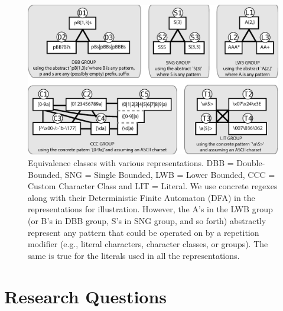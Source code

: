 \begin{figure}[tb]
\centering
\includegraphics[width=\textwidth]{illustrations/refactoringTree.eps}
\vspace{-6pt}
\caption{Equivalence classes with various representations. DBB = Double-Bounded, SNG = Single Bounded, LWB = Lower Bounded, CCC = Custom Character Class and LIT = Literal. We use concrete regexes along with their Deterministic Finite Automaton (DFA) in the representations for illustration. However, the A's in the LWB group (or B's in DBB group, S's in SNG group, and so forth) abstractly represent any pattern that could be operated on by a repetition modifier (e.g., literal characters, character classes, or groups). The same is true for the literals used in all the representations. }
\vspace{-6pt}
\label{fig:refactoringTree}
\end{figure}


\section{Research Questions}
\label{sec:study}

